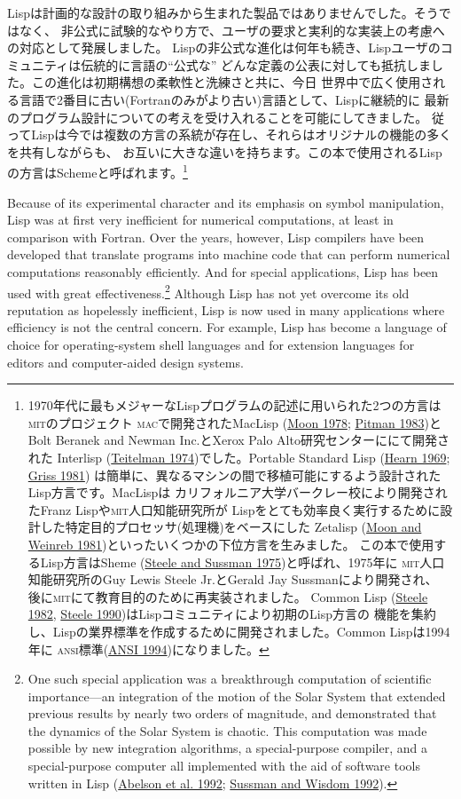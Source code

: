 \documentclass[oneside]{book}
\newcommand{\acronym}[1]{\textsc{\MakeLowercase{#1}}}
\newcommand{\link}[1]{\hyperref[#1]{#1}}
\begin{document}
Lispは計画的な設計の取り組みから生まれた製品ではありませんでした。そうではなく、
非公式に試験的なやり方で、ユーザの要求と実利的な実装上の考慮への対応として発展しました。
Lispの非公式な進化は何年も続き、Lispユーザのコミュニティは伝統的に言語の``公式な''
どんな定義の公表に対しても抵抗しました。この進化は初期構想の柔軟性と洗練さと共に、今日
世界中で広く使用される言語で2番目に古い(Fortranのみがより古い)言語として、Lispに継続的に
最新のプログラム設計についての考えを受け入れることを可能にしてきました。
従ってLispは今では複数の方言の系統が存在し、それらはオリジナルの機能の多くを共有しながらも、
お互いに大きな違いを持ちます。この本で使用されるLispの方言はSchemeと呼ばれます。\footnote{
1970年代に最もメジャーなLispプログラムの記述に用いられた2つの方言は\acronym{MIT}のプロジェクト
\acronym{MAC}で開発されたMacLisp (\link{Moon 1978}; \link{Pitman 1983})と
Bolt Beranek and Newman Inc.とXerox Palo Alto研究センターににて開発された
Interlisp (\link{Teitelman 1974})でした。Portable Standard Lisp (\link{Hearn 1969}; \link{Griss 1981})
は簡単に、異なるマシンの間で移植可能にするよう設計されたLisp方言です。MacLispは
カリフォルニア大学バークレー校により開発されたFranz Lispや\acronym{MIT}人口知能研究所が
Lispをとても効率良く実行するために設計した特定目的プロセッサ(処理機)をベースにした
Zetalisp (\link{Moon and Weinreb 1981})といったいくつかの下位方言を生みました。
この本で使用するLisp方言はSheme (\link{Steele and Sussman 1975})と呼ばれ、1975年に
\acronym{MIT}人口知能研究所のGuy Lewis Steele Jr.とGerald Jay Sussmanにより開発され、
後に\acronym{MIT}にて教育目的のために再実装されました。
Common Lisp (\link{Steele 1982}, \link{Steele 1990})はLispコミュニティにより初期のLisp方言の
機能を集約し、Lispの業界標準を作成するために開発されました。Common Lispは1994年に
\acronym{ANSI}標準(\link{ANSI 1994})になりました。
}

Because of its experimental character and its emphasis on symbol manipulation,
Lisp was at first very inefficient for numerical computations, at least in
comparison with Fortran.  Over the years, however, Lisp compilers have been
developed that translate programs into machine code that can perform numerical
computations reasonably efficiently.  And for special applications, Lisp has
been used with great effectiveness.\footnote{One such special application was a
breakthrough computation of scientific importance---an integration of the
motion of the Solar System that extended previous results by nearly two orders
of magnitude, and demonstrated that the dynamics of the Solar System is
chaotic.  This computation was made possible by new integration algorithms, a
special-purpose compiler, and a special-purpose computer all implemented with
the aid of software tools written in Lisp (\link{Abelson et al. 1992}; \link{Sussman and Wisdom 1992}).}  
Although Lisp has not yet overcome its old reputation as
hopelessly inefficient, Lisp is now used in many applications where efficiency
is not the central concern.  For example, Lisp has become a language of choice
for operating-system shell languages and for extension languages for editors
and computer-aided design systems.
\end{document}
